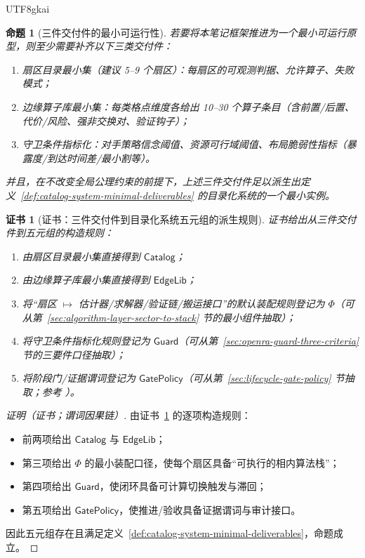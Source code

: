 \documentclass[12pt]{article}
\newtheorem{proposition}{命题}[section]
\newtheorem{Certificate}{证书}[section]
\begin{document}
\begin{CJK*}{UTF8}{gkai}
\begin{proposition}[三件交付件的最小可运行性]
\label{prop:next-actions-three-deliverables-minimal}
若要将本笔记框架推进为一个最小可运行原型，则至少需要补齐以下三类交付件：
\begin{enumerate}
  \item 扇区目录最小集（建议 5--9 个扇区）：每扇区的可观测判据、允许算子、失败模式；
  \item 边缘算子库最小集：每类格点维度各给出 10--30 个算子条目（含前置/后置、代价/风险、强非交换对、验证钩子）；
  \item 守卫条件指标化：对手策略信念阈值、资源可行域阈值、布局脆弱性指标（暴露度/到达时间差/最小割等）。
\end{enumerate}
并且，在不改变全局公理约束的前提下，上述三件交付件足以派生出定义~\ref{def:catalog-system-minimal-deliverables} 的目录化系统的一个最小实例。
\end{proposition}

\begin{Certificate}[证书：三件交付件到目录化系统五元组的派生规则]
\label{cert:next-actions-three-deliverables-minimal}
证书给出从三件交付件到五元组的构造规则：
\begin{enumerate}
  \item 由扇区目录最小集直接得到 $\mathsf{Catalog}$；
  \item 由边缘算子库最小集直接得到 $\mathsf{EdgeLib}$；
  \item 将“扇区 $\mapsto$ 估计器/求解器/验证链/搬运接口”的默认装配规则登记为 $\Phi$（可从第~\ref{sec:algorithm-layer-sector-to-stack} 节的最小组件抽取）；
  \item 将守卫条件指标化规则登记为 $\mathsf{Guard}$（可从第~\ref{sec:openra-guard-three-criteria} 节的三要件口径抽取）；
  \item 将阶段门/证据谓词登记为 $\mathsf{GatePolicy}$（可从第~\ref{sec:lifecycle-gate-policy} 节抽取；参考 \cite{ref_nasa_trl,
    ref_stage_gate_dtl}）。
\end{enumerate}
\end{Certificate}

\begin{proof}[证明（证书；谓词因果链）]
由证书~\ref{cert:next-actions-three-deliverables-minimal} 的逐项构造规则：
\begin{itemize}
  \item 前两项给出 $\mathsf{Catalog}$ 与 $\mathsf{EdgeLib}$；
  \item 第三项给出 $\Phi$ 的最小装配口径，使每个扇区具备“可执行的相内算法栈”；
  \item 第四项给出 $\mathsf{Guard}$，使闭环具备可计算切换触发与滞回；
  \item 第五项给出 $\mathsf{GatePolicy}$，使推进/验收具备证据谓词与审计接口。
\end{itemize}
因此五元组存在且满足定义~\ref{def:catalog-system-minimal-deliverables}，命题成立。
\end{proof}


\end{CJK*}
\end{document}
